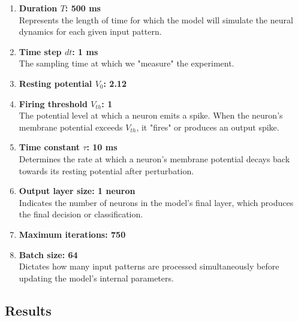\begin{enumerate}
    \item \textbf{Duration \( T \): 500 ms} \\
    Represents the length of time for which the model will simulate the neural dynamics for each given input pattern.
    
    \item \textbf{Time step \( dt \): 1 ms} \\
    The sampling time at which we "measure" the experiment.
    
    \item \textbf{Resting potential \( V_0 \): 2.12} 
    
    \item \textbf{Firing threshold \( V_{th} \): 1} \\
    The potential level at which a neuron emits a spike. When the neuron's membrane potential exceeds \( V_{th} \), it "fires" or produces an output spike.
    
    \item \textbf{Time constant \( \tau \): 10 ms} \\
    Determines the rate at which a neuron's membrane potential decays back towards its resting potential after perturbation.
    
    \item \textbf{Output layer size: 1 neuron} \\
    Indicates the number of neurons in the model's final layer, which produces the final decision or classification.
    
    \item \textbf{Maximum iterations: 750} 

    \item \textbf{Batch size: 64} \\
    Dictates how many input patterns are processed simultaneously before updating the model's internal parameters. 

\end{enumerate}

\subsection{Results}

